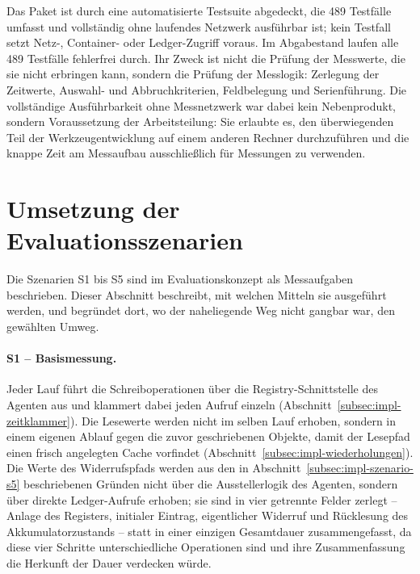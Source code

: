 Das Paket ist durch eine automatisierte Testsuite abgedeckt, die 489 Testfälle umfasst und vollständig ohne laufendes Netzwerk ausführbar ist; kein Testfall setzt Netz-, Container- oder Ledger-Zugriff voraus. Im Abgabestand laufen alle 489 Testfälle fehlerfrei durch. Ihr Zweck ist nicht die Prüfung der Messwerte, die sie nicht erbringen kann, sondern die Prüfung der Messlogik: Zerlegung der Zeitwerte, Auswahl- und Abbruchkriterien, Feldbelegung und Serienführung. Die vollständige Ausführbarkeit ohne Messnetzwerk war dabei kein Nebenprodukt, sondern Voraussetzung der Arbeitsteilung: Sie erlaubte es, den überwiegenden Teil der Werkzeugentwicklung auf einem anderen Rechner durchzuführen und die knappe Zeit am Messaufbau ausschließlich für Messungen zu verwenden.



\section{Umsetzung der Evaluationsszenarien}
\label{sec:impl-szenarien}

Die Szenarien S1 bis S5 sind im Evaluationskonzept als Messaufgaben beschrieben. Dieser Abschnitt beschreibt, mit welchen Mitteln sie ausgeführt werden, und begründet dort, wo der naheliegende Weg nicht gangbar war, den gewählten Umweg.

\paragraph{S1 -- Basismessung.} Jeder Lauf führt die Schreiboperationen über die Registry-Schnittstelle des Agenten aus und klammert dabei jeden Aufruf einzeln (Abschnitt~\ref{subsec:impl-zeitklammer}). Die Lesewerte werden nicht im selben Lauf erhoben, sondern in einem eigenen Ablauf gegen die zuvor geschriebenen Objekte, damit der Lesepfad einen frisch angelegten Cache vorfindet (Abschnitt~\ref{subsec:impl-wiederholungen}). Die Werte des Widerrufspfads werden aus den in Abschnitt~\ref{subsec:impl-szenario-s5} beschriebenen Gründen nicht über die Ausstellerlogik des Agenten, sondern über direkte Ledger-Aufrufe erhoben; sie sind in vier getrennte Felder zerlegt -- Anlage des Registers, initialer Eintrag, eigentlicher Widerruf und Rücklesung des Akkumulatorzustands -- statt in einer einzigen Gesamtdauer zusammengefasst, da diese vier Schritte unterschiedliche Operationen sind und ihre Zusammenfassung die Herkunft der Dauer verdecken würde.

